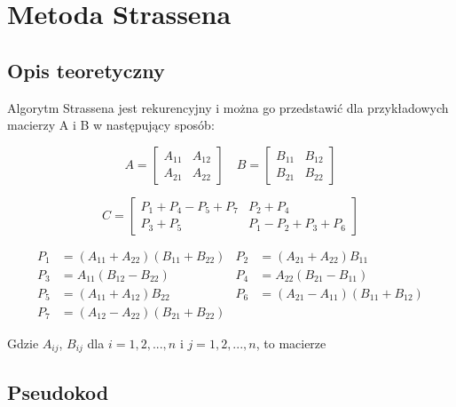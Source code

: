 \documentclass{article}
\begin{document}
\section{Metoda Strassena}

\subsection{Opis teoretyczny}

Algorytm Strassena jest rekurencyjny i można go przedstawić dla przykładowych macierzy A i B w następujący sposób:

\[
A =
\begin{bmatrix}
A_{11} & A_{12} \\
A_{21} & A_{22}
\end{bmatrix}
\quad
B =
\begin{bmatrix}
B_{11} & B_{12} \\
B_{21} & B_{22}
\end{bmatrix}
\]

\[
C =
\begin{bmatrix}
P_{1} + P_{4} - P_{5} + P_{7} & P_{2} + P_{4} \\
P_{3} + P_{5} & P_{1} - P_{2} + P_{3} + P_{6}
\end{bmatrix}
\]

\[
\begin{aligned}
P_1 & = (A_{11} + A_{22})(B_{11} + B_{22}) & P_2 & = (A_{21} + A_{22})B_{11} \\
P_3 & = A_{11}(B_{12} - B_{22}) & P_4 & = A_{22}(B_{21} - B_{11}) \\
P_5 & = (A_{11} + A_{12})B_{22} & P_6 & = (A_{21} - A_{11})(B_{11} + B_{12}) \\
P_7 & = (A_{12} - A_{22})(B_{21} + B_{22}) &
\end{aligned}
\]

Gdzie \(A_{ij}\), \(B_{ij}\) dla \(i = {1, 2, ..., n}\) i \({j = {1, 2, ..., n}}\), to macierze

\subsection{Pseudokod}
\end{document}
